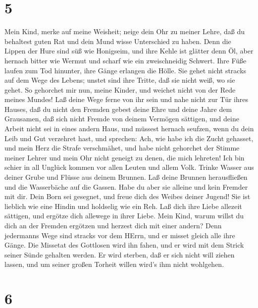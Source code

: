 \hypertarget{section-4}{%
\section{5}\label{section-4}}

 Mein Kind, merke auf meine Weisheit; neige dein Ohr zu
meiner Lehre,  daß du behaltest guten Rat und dein Mund
wisse Unterschied zu haben.  Denn die Lippen der Hure sind
süß wie Honigseim, und ihre Kehle ist glätter denn Öl,  aber
hernach bitter wie Wermut und scharf wie ein zweischneidig Schwert.
 Ihre Füße laufen zum Tod hinunter, ihre Gänge erlangen die
Hölle.  Sie gehet nicht stracks auf dem Wege des Lebens;
unstet sind ihre Tritte, daß sie nicht weiß, wo sie gehet. 
So gehorchet mir nun, meine Kinder, und weichet nicht von der Rede
meines Mundes!  Laß deine Wege ferne von ihr sein und nahe
nicht zur Tür ihres Hauses,  daß du nicht den Fremden gebest
deine Ehre und deine Jahre dem Grausamen,  daß sich nicht
Fremde von deinem Vermögen sättigen, und deine Arbeit nicht sei in eines
andern Haus,  und müssest hernach seufzen, wenn du dein
Leib und Gut verzehret hast,  und sprechen: Ach, wie habe
ich die Zucht gehasset, und mein Herz die Strafe verschmähet,
 und habe nicht gehorchet der Stimme meiner Lehrer und mein
Ohr nicht geneigt zu denen, die mich lehreten!  Ich bin
schier in all Unglück kommen vor allen Leuten und allem Volk.
 Trinke Wasser aus deiner Grube und Flüsse aus deinem
Brunnen.  Laß deine Brunnen herausfließen und die
Wasserbäche auf die Gassen.  Habe du aber sie alleine und
kein Fremder mit dir.  Dein Born sei gesegnet, und freue
dich des Weibes deiner Jugend!  Sie ist lieblich wie eine
Hindin und holdselig wie ein Reh. Laß dich ihre Liebe allezeit sättigen,
und ergötze dich allewege in ihrer Liebe.  Mein Kind, warum
willst du dich an der Fremden ergötzen und herzest dich mit einer
andern?  Denn jedermanns Wege sind stracks vor dem HErrn,
und er misset gleich alle ihre Gänge.  Die Missetat des
Gottlosen wird ihn fahen, und er wird mit dem Strick seiner Sünde
gehalten werden.  Er wird sterben, daß er sich nicht will
ziehen lassen, und um seiner großen Torheit willen wird's ihm nicht
wohlgehen.

\hypertarget{section-5}{%
\section{6}\label{section-5}}

